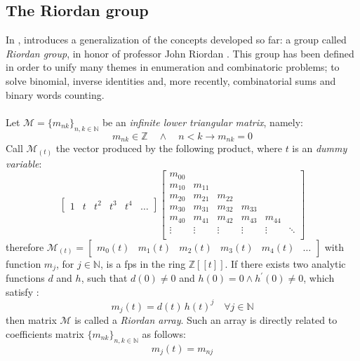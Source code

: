 
\subsection{The Riordan group}

In \cite{shapiro:1991}, \citeauthor{shapiro:1991} introduces a
generalization of the concepts developed so far: a group called 
\emph{Riordan group}, in honor of professor John Riordan
.
This group has been defined in order to unify many themes in 
enumeration and combinatoric problems; to solve binomial, 
inverse identities and, more recently, combinatorial
sums and binary words counting. 
\\\\
Let $\mathcal{M}=\lbrace m_{nk}\rbrace_{n,k\in\mathbb{N}}$ be an \emph{infinite
lower triangular matrix}, namely:
\begin{displaymath}
     m_{nk}\in\mathbb{Z} \quad\wedge\quad n < k \rightarrow m_{nk} = 0
\end{displaymath}
Call $\mathcal{M}_{(t)}$ the vector produced by the following product, 
where $t$ is an \emph{dummy variable}:
\begin{displaymath}
    \left[
        \begin{array}{cccccc}
            1 & t & t^{2} & t^{3} & t^{4} &\ldots
        \end{array}
    \right]
    \left[
        \begin{array}{cccccc}
            m_{00} & & & &  &\\
            m_{10} & m_{11} & & &  &\\
            m_{20} & m_{21}& m_{22}& &  &\\
            m_{30} & m_{31}& m_{32}& m_{33}&  &\\
            m_{40} & m_{41}& m_{42}& m_{43}& m_{44} &\\
            \vdots & \vdots& \vdots& \vdots& \vdots & \ddots\\
        \end{array}
    \right]
\end{displaymath}
therefore $\mathcal{M}_{(t)} =
    \left[
        \begin{array}{cccccc}
            m_{0}(t) & m_{1}(t) & m_{2}(t) & m_{3}(t) &m_{4}(t) & \ldots
        \end{array}
    \right]$ 
with function $m_{j}$, for $j\in\mathbb{N}$, is a \ac{fps} in the ring 
$\mathbb{Z}[\![t]\!]$. If there exists two analytic functions $d$
and $h$, such that $d(0)\neq0$ and $h(0)=0 \wedge h^{\prime}(0)\neq0$, which
satisfy :
\begin{displaymath}
    m_{j}(t)=d(t)\,h(t)^{j} \quad \forall j\in\mathbb{N}
\end{displaymath}
then matrix $\mathcal{M}$ is called a \emph{Riordan array}. Such an array is
directly related to coefficients matrix $\lbrace m_{nk}\rbrace_{n,k\in\mathbb{N}}$ as follows:
\begin{displaymath}
    [t^{n}]m_{j}(t)=m_{nj}
\end{displaymath}

